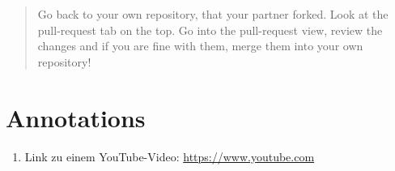 \documentclass{dcbl/challenge}
\begin{document}
\begin{abstract}
    Go back to your own repository, that your partner forked. 
    Look at the pull-request tab on the top. 
    Go into the pull-request view, review the changes and if you are fine with them, merge them into your own repository!
\end{abstract}

\section*{Annotations}
\begin{enumerate}
    \item Link zu einem YouTube-Video: \url{https://www.youtube.com}
\end{enumerate}
\end{document}
